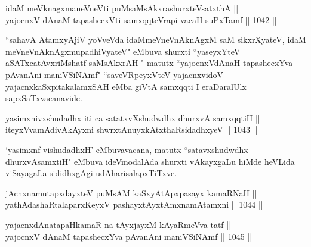 
\begin{shl}
idaM meV\s knagxmaneVneVti puMsaMsAkxrashurxteVsatxthA || \\
yajocnxV dAnaM tapashecxVti samxqqteVrapi vacaH suPxTamf \hfill || 1042 || 
\end{shl}

\begin{artha}
``sahavA AtamxyAjiV yoVveVda idaMmeV\s neVnAknAgxM saM sikxrXyateV, idaM meV\s neVnAknAgxmupadhiVyateV" eMbuva shurxti ``yaseyxYteV aSATxcatAvxriMshatf saMsAkxrAH " matutx ``yajocnxVdAnaH tapashecxYva pAvanAni maniVSiNAmf" ``saveVRpeyxVteV yajacnxvidoV yajacnxkaSxpitakalamxSAH eMba giVtA samxqqti I eraDaralUlx sapxSaTxvacanavide.
\end{artha}


\begin{shl}
\footnotemark[1]yasimxnivxshudadhx iti ca \footnotemark[2]satatxvXshudwdhx dhurxvA samxqqtiH || \\
iteyxVvamAdivAkAyxni shwrxtAnuyxkAtxthaRsidadhxyeV \hfill || 1043 ||  
\end{shl}

\begin{artha}
`yasimxnf vishudadhxH' eMbuvavacana, matutx ``satavxshudwdhx dhurxvAsamxtiH" eMbuva ideVmodalAda shurxti vAkayxgaLu hiMde heVLida viSayagaLa sididhxgAgi udAharisalapxTiTxve.
\end{artha}


\begin{shl}
jAcnxnamutapxdayxteV puMsAM kaSxyAtApxpasayx kamaRNaH || \\
yathA\s \s dashaRtalaparxKeyxV pashayxtAyxtAmxnamAtamxni \hfill || 1044 ||  
\end{shl}

\begin{shl}
yajacnxdAnatapaHkamaR na tAyxjayxM kAyaRmeVva tatf || \\
yajocnxV dAnaM tapashecxYva pAvanAni maniVSiNAmf \hfill || 1045 ||  
\end{shl}
				
